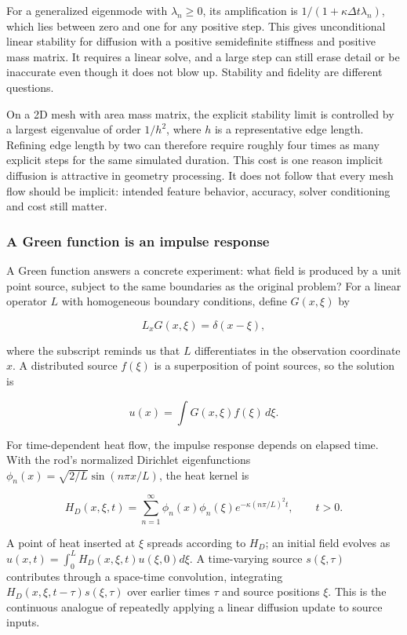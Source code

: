 For a generalized eigenmode with \(\lambda_n\ge0\), its amplification is \(1/(1+\kappa\Delta t\lambda_n)\), which lies between zero and one for any positive step. This gives unconditional linear stability for diffusion with a positive semidefinite stiffness and positive mass matrix. It requires a linear solve, and a large step can still erase detail or be inaccurate even though it does not blow up. Stability and fidelity are different questions.

On a 2D mesh with area mass matrix, the explicit stability limit is controlled by a largest eigenvalue of order \(1/h^2\), where \(h\) is a representative edge length. Refining edge length by two can therefore require roughly four times as many explicit steps for the same simulated duration. This cost is one reason implicit diffusion is attractive in geometry processing. It does not follow that every mesh flow should be implicit: intended feature behavior, accuracy, solver conditioning and cost still matter.

\subsubsection{A Green function is an impulse response}\label{02-foundations-ii-ch025-a-green-function-is-an-impulse-response}

\hypertarget{02-foundations-ii-ch025-a-green-function-is-an-impulse-response}{}

A Green function answers a concrete experiment: what field is produced by a unit point source, subject to the same boundaries as the original problem? For a linear operator \(L\) with homogeneous boundary conditions, define \(G(x,\xi)\) by

\[
L_xG(x,\xi)=\delta(x-\xi),
\]

where the subscript reminds us that \(L\) differentiates in the observation coordinate \(x\). A distributed source \(f(\xi)\) is a superposition of point sources, so the solution is

\[
u(x)=\int G(x,\xi)f(\xi)\,d\xi.
\]

For time-dependent heat flow, the impulse response depends on elapsed time. With the rod's normalized Dirichlet eigenfunctions \(\phi_n(x)=\sqrt{2/L}\sin(n\pi x/L)\), the heat kernel is

\[
H_D(x,\xi,t)=\sum_{n=1}^{\infty}\phi_n(x)\phi_n(\xi)e^{-\kappa(n\pi/L)^2t},\qquad t>0.
\]

A point of heat inserted at \(\xi\) spreads according to \(H_D\); an initial field evolves as \(u(x,t)=\int_0^LH_D(x,\xi,t)u(\xi,0)d\xi\). A time-varying source \(s(\xi,\tau)\) contributes through a space-time convolution, integrating \(H_D(x,\xi,t-\tau)s(\xi,\tau)\) over earlier times \(\tau\) and source positions \(\xi\). This is the continuous analogue of repeatedly applying a linear diffusion update to source inputs.

